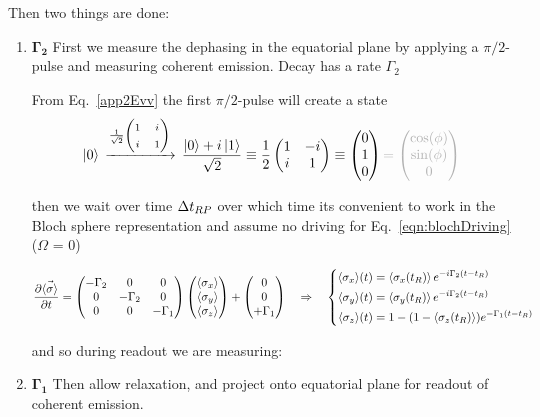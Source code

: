  Then two things are done:
 \begin{enumerate}
 \item $ \mathbf{\Gamma_2} $  First we measure the dephasing in the equatorial  plane by applying a
   $ \pi/2$-pulse and measuring coherent emission. Decay has a rate $ \Gamma_2 $
   	
   	
   From Eq.~\eqref{app2Evv} the first $ \pi/2$-pulse will create a state
   \[
     \iket{0}
     \iratext{$                                                             \frac{1}{\sqrt{2}}
       $\imatrix{1}{i}{i}{1}}\frac{\iket{0}+i\iket{1}}{\sqrt{2}}                             \equiv
     \frac{1}{2}\imatrix{1}{-i}{i}{1}\equiv\imatrixthree{0}{1}{0}\grey{=\imatrixthree{\cos(\phi)}{\sin(\phi)}{0}}
   \]
   	
   \noindent then we wait over time $ \Delta t_{RP} $ over which time its convenient to work in
   the  Bloch sphere  representation and  assume no  driving for  Eq.~\eqref{eqn:blochDriving}
   ($ \Omega $ = 0)
   	
   	 \begin{equation}\label{eqn:dynamics_relax}
            \frac{\partial\vec{\left\langle \sigma \right\rangle}}{\partial t} = \begin{pmatrix}
             -\Gamma_2&0&0\\0&-\Gamma_2&0\\0&0&-\Gamma_1\\
           \end{pmatrix}\begin{pmatrix}
             \left\langle \sigma_x \right\rangle\\\left\langle \sigma_y \right\rangle\\\left\langle \sigma_z \right\rangle
           \end{pmatrix}+\begin{pmatrix} 0\\0\\+\Gamma_1
           \end{pmatrix}\quad\Rightarrow\quad
           \left\lbrace\begin{aligned}
             {\ensuremath{\left\langle \sigma_x \right\rangle}} (t) & = \left\langle \sigma_x(t_R) \right\rangle e^{-i\Gamma_{2}(t-t_R)}\\
             {\left\langle \sigma_y \right\rangle} (t) & = \left\langle \sigma_y(t_R) \right\rangle e^{-i\Gamma_{2}(t-t_R)}\\
             {\left\langle \sigma_z \right\rangle} (t) & = 1-(1-\left\langle \sigma_z(t_R) \right\rangle)e^{-\Gamma_1(t-t_R)}
           \end{aligned}\right.
         \end{equation}
   	
         and         so        during         readout         we        are         measuring:
         \iframe{\[ \isigmay = e^{-i\Gamma_2(t-\Delta t\isub{TR})}
           \]}
       \item $  \mathbf{\Gamma_1} $ Then  allow relaxation, and  project onto equatorial  plane for
         readout of coherent emission.  
   	

\end{enumerate}
